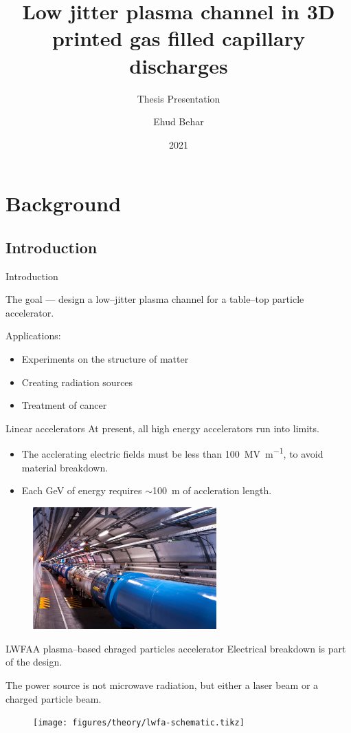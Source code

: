 \documentclass[dvipsnames]{beamer}
\title{Low jitter plasma channel in 3D printed gas filled capillary discharges}
\subtitle{Thesis Presentation}
\author{Ehud Behar}
\institute{Hebrew University of Jerusalem}
\date{2021}
\begin{document}
\frame{\titlepage}

\section{Background}
\subsection{Introduction}
  \begin{frame}{Introduction}
  \begin{center}
    The goal --- design a low--jitter plasma channel for a table--top particle accelerator.
  \end{center}
    Applications:
    \begin{itemize}
        \item[\textbullet] Experiments on the structure of matter
        \item[\textbullet] Creating radiation sources
        \item[\textbullet] Treatment of cancer
    \end{itemize}
  \end{frame}

\begin{frame}{Linear accelerators}
At present, all high energy accelerators run into limits.
\begin{itemize}
\item[\textbullet] The acclerating electric fields must be less than \SI[per-mode=symbol]{100}{\mega \V \per\meter}, to avoid material breakdown.
\item[\textbullet] Each \si{\giga \eV} of energy requires $\sim$\SI{100}{\meter} of accleration length.
\end{itemize}
\begin{figure}
\includegraphics[width=200pt]{figures/theory/lhc_cern_compressed.jpg}
\end{figure}
\end{frame}
\begin{frame}{LWFA}{A plasma--based chraged particles accelerator}
Electrical breakdown is part of the design.

The power source is not microwave radiation, but either a laser beam or a charged particle beam.
\begin{figure}
\texttt{[image: figures/theory/lwfa-schematic.tikz]}
\end{figure}
\end{frame}
\end{document}
